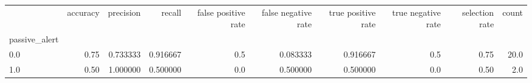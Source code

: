 \begin{tabular}{lrrrrrrrrr}
\toprule
{} &  accuracy &  precision &    recall &  false positive rate &  false negative rate &  true positive rate &  true negative rate &  selection rate &  count \\
passive\_alert &           &            &           &                      &                      &                     &                     &                 &        \\
\midrule
0.0           &      0.75 &   0.733333 &  0.916667 &                  0.5 &             0.083333 &            0.916667 &                 0.5 &            0.75 &   20.0 \\
1.0           &      0.50 &   1.000000 &  0.500000 &                  0.0 &             0.500000 &            0.500000 &                 0.0 &            0.50 &    2.0 \\
\bottomrule
\end{tabular}
